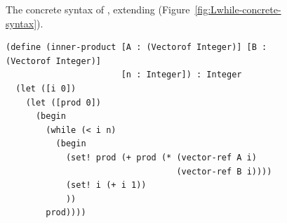 \documentclass[7x10]{TimesAPriori_MIT}%
\newcommand{\gray}[1]{{\color{gray} #1}}
\begin{document}
{\begin{figure}[tp]
\centering
\fbox{
  \begin{minipage}{0.96\textwidth}
    \small
\[
\begin{array}{lcl}
  \Type &::=& \ldots \MID \LP \key{Vectorof}~\Type \RP \\
  \Exp &::=& \gray{ \Int \MID \CREAD{} \MID \CNEG{\Exp}
     \MID \CADD{\Exp}{\Exp} \MID \CSUB{\Exp}{\Exp} }  \MID \CMUL{\Exp}{\Exp}\\
    &\MID&  \gray{ \Var \MID \CLET{\Var}{\Exp}{\Exp} }\\
    &\MID& \gray{\key{\#t} \MID \key{\#f} 
     \MID \LP\key{and}\;\Exp\;\Exp\RP 
     \MID \LP\key{or}\;\Exp\;\Exp\RP 
     \MID \LP\key{not}\;\Exp\RP } \\
    &\MID& \gray{ \LP\key{eq?}\;\Exp\;\Exp\RP \MID \CIF{\Exp}{\Exp}{\Exp} } \\
    &\MID& \gray{ \LP\key{vector}\;\Exp\ldots\RP \MID
          \LP\key{vector-ref}\;\Exp\;\Int\RP} \\
    &\MID& \gray{\LP\key{vector-set!}\;\Exp\;\Int\;\Exp\RP\MID \LP\key{void}\RP
    \MID \LP\Exp \; \Exp\ldots\RP } \\
    &\MID& \gray{ \LP \key{procedure-arity}~\Exp\RP 
    \MID \CLAMBDA{\LP\LS\Var \key{:} \Type\RS\ldots\RP}{\Type}{\Exp} } \\
  &\MID& \gray{ \CSETBANG{\Var}{\Exp}
  \MID \CBEGIN{\Exp\ldots}{\Exp}
  \MID \CWHILE{\Exp}{\Exp} } \\
  &\MID& \CMAKEVEC{\Exp}{\Exp} \\
  \Def &::=& \gray{ \CDEF{\Var}{\LS\Var \key{:} \Type\RS\ldots}{\Type}{\Exp} } \\
  \LangArray{} &::=& \gray{\Def\ldots \; \Exp}
\end{array}
\]
\end{minipage}
}
\caption{The concrete syntax of \LangArray{}, extending \LangLoop{} (Figure~\ref{fig:Lwhile-concrete-syntax}).}
\label{fig:Lvecof-concrete-syntax}
\end{figure}


\begin{figure}[tp]
\begin{lstlisting}
(define (inner-product [A : (Vectorof Integer)] [B : (Vectorof Integer)]
                       [n : Integer]) : Integer
  (let ([i 0])
    (let ([prod 0])
      (begin
        (while (< i n)
          (begin
            (set! prod (+ prod (* (vector-ref A i)
                                  (vector-ref B i))))
            (set! i (+ i 1))
            ))
        prod))))
  


\end{lstlisting}
\end{figure}}
\end{document}
